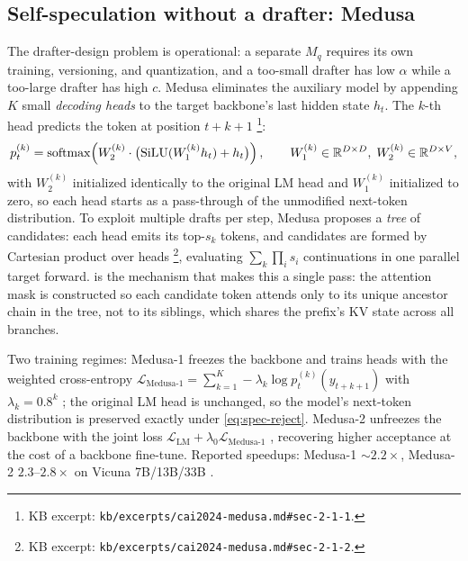 \subsection{Self-speculation without a drafter: Medusa}
\label{sec:mt-medusa}

The drafter-design problem is operational: a separate $M_q$ requires
its own training, versioning, and quantization, and a too-small drafter
has low $\alpha$ while a too-large drafter has high $c$. Medusa
\citep{cai2024-medusa} eliminates the auxiliary model by appending
$K$ small \emph{decoding heads} to the target backbone's last hidden
state $h_t$. The $k$-th head predicts the token at position $t + k +
1$ \citep[\S 2.1.1]{cai2024-medusa}\footnote{KB excerpt:
\texttt{kb/excerpts/cai2024-medusa.md\#sec-2-1-1}.}:
\begin{equation}
p_t^{(k)} = \operatorname{softmax}\!\left(W_2^{(k)} \cdot \bigl(\operatorname{SiLU}(W_1^{(k)} h_t) + h_t\bigr)\right),
\qquad W_1^{(k)} \in \mathbb{R}^{D \times D}, \; W_2^{(k)} \in \mathbb{R}^{D \times V},
\label{eq:medusa-head}
\end{equation}
with $W_2^{(k)}$ initialized identically to the original LM head and
$W_1^{(k)}$ initialized to zero, so each head starts as a pass-through
of the unmodified next-token distribution. To exploit multiple drafts
per step, Medusa proposes a \emph{tree} of candidates: each head emits
its top-$s_k$ tokens, and candidates are formed by Cartesian product
over heads \citep[\S 2.1.2]{cai2024-medusa}\footnote{KB excerpt:
\texttt{kb/excerpts/cai2024-medusa.md\#sec-2-1-2}.}, evaluating
$\sum_k \prod_i s_i$ continuations in one parallel target forward.
\emph{} is the mechanism that makes this a single pass:
the attention mask is constructed so each candidate token attends only
to its unique ancestor chain in the tree, not to its siblings, which
shares the prefix's KV state across all branches.

Two training regimes:
Medusa-1 freezes the backbone and trains heads with the weighted
cross-entropy
$\mathcal{L}_{\text{Medusa-1}} = \sum_{k=1}^{K} -\lambda_k \log p_t^{(k)}(y_{t+k+1})$
with $\lambda_k = 0.8^k$ \citep[\S 2.2.1, Eq.~1]{cai2024-medusa};
the original LM head is unchanged, so the model's next-token
distribution is preserved exactly under \cref{eq:spec-reject}.
Medusa-2 unfreezes the backbone with the joint loss
$\mathcal{L}_{\text{LM}} + \lambda_0 \mathcal{L}_{\text{Medusa-1}}$
\citep[\S 2.2.2]{cai2024-medusa}, recovering higher acceptance at the
cost of a backbone fine-tune. Reported speedups: Medusa-1
$\sim 2.2\times$, Medusa-2 $2.3$--$2.8\times$ on Vicuna 7B/13B/33B
\citep[abstract]{cai2024-medusa}.

